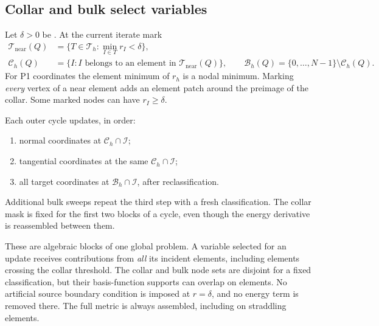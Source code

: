 \documentclass[11pt,a4paper]{article}
\newcommand{\code}[1]{\texttt{\detokenize{#1}}}
\newcommand{\free}{\mathcal I}
\newcommand{\collar}{\mathcal C_h}
\newcommand{\bulk}{\mathcal B_h}
\begin{document}
\subsection{Collar and bulk select variables}
Let \(\delta>0\) be \code{tube_radius}. At the current iterate mark
\begin{align}
 \mathcal T_{\mathrm{near}}(Q)
 &=\{T\in\mathcal T_h:\min_{I\in T}r_I<\delta\},\\
 \collar(Q)&=\{I:I\text{ belongs to an element in }\mathcal T_{\mathrm{near}}(Q)\},
 \qquad \bulk(Q)=\{0,\ldots,N-1\}\setminus\collar(Q).
 \label{eq:blocks}
\end{align}
For P1 coordinates the element minimum of \(r_h\) is a nodal minimum.
Marking \emph{every} vertex of a near element adds an element patch around
the preimage of the collar. Some marked nodes can have \(r_I\geq\delta\).

Each outer cycle updates, in order:
\begin{enumerate}
 \item normal coordinates at \(\collar\cap\free\);
 \item tangential coordinates at the same \(\collar\cap\free\);
 \item all target coordinates at \(\bulk\cap\free\), after reclassification.
\end{enumerate}
Additional bulk sweeps repeat the third step with a fresh classification.
The collar mask is fixed for the first two blocks of a cycle, even though
the energy derivative is reassembled between them.

These are algebraic blocks of one global problem. A variable selected for
an update receives contributions from \emph{all} its incident elements,
including elements crossing the collar threshold. The collar and bulk
node sets are disjoint for a fixed classification, but their basis-function
supports can overlap on elements. No artificial source boundary condition
is imposed at \(r=\delta\), and no energy term is removed there.
The full metric is always assembled, including on straddling elements.
\end{document}
